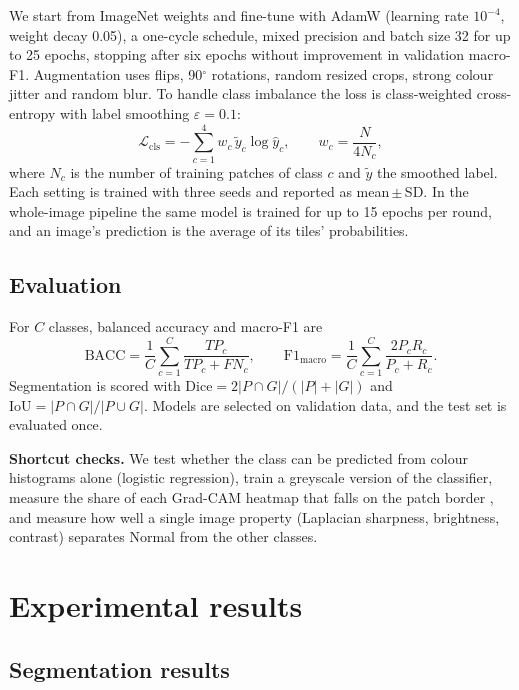 \documentclass[10pt,twocolumn]{article}
\begin{document}
We start from ImageNet weights and fine-tune with AdamW (learning rate $10^{-4}$, weight decay 0.05), a one-cycle schedule, mixed precision and batch size 32 for up to 25 epochs, stopping after six epochs without improvement in validation macro-F1. Augmentation uses flips, 90$^\circ$ rotations, random resized crops, strong colour jitter and random blur. To handle class imbalance the loss is class-weighted cross-entropy with label smoothing $\varepsilon = 0.1$:
\begin{equation}
\mathcal{L}_{\text{cls}} = -\sum_{c=1}^{4} w_c\, \tilde{y}_c \log \hat{y}_c, \qquad w_c = \frac{N}{4 N_c},
\end{equation}
where $N_c$ is the number of training patches of class $c$ and $\tilde{y}$ the smoothed label. Each setting is trained with three seeds and reported as mean\,$\pm$\,SD. In the whole-image pipeline the same model is trained for up to 15 epochs per round, and an image's prediction is the average of its tiles' probabilities.

\subsection{Evaluation}

For $C$ classes, balanced accuracy and macro-F1 are
\begin{equation}
\text{BACC} = \frac{1}{C}\sum_{c=1}^{C}\frac{TP_c}{TP_c + FN_c}, \qquad \text{F1}_{\text{macro}} = \frac{1}{C}\sum_{c=1}^{C}\frac{2P_cR_c}{P_c + R_c}.
\end{equation}
Segmentation is scored with $\text{Dice} = 2|P\cap G|/(|P|+|G|)$ and $\text{IoU} = |P\cap G|/|P\cup G|$. Models are selected on validation data, and the test set is evaluated once.

\textbf{Shortcut checks.} We test whether the class can be predicted from colour histograms alone (logistic regression), train a greyscale version of the classifier, measure the share of each Grad-CAM heatmap that falls on the patch border \citep{vandervelden2022}, and measure how well a single image property (Laplacian sharpness, brightness, contrast) separates Normal from the other classes.

\section{Experimental results}

\subsection{Segmentation results}
\end{document}

